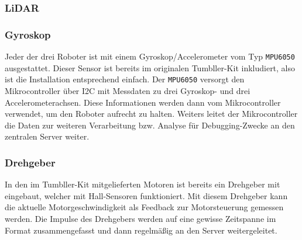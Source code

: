 \subsubsection{LiDAR}
\label{subsec:ueberblick_lidar}

\subsubsection{Gyroskop}
Jeder der drei Roboter ist mit einem Gyroskop/Accelerometer vom Typ \texttt{MPU6050} ausgestattet.
%
Dieser Sensor ist bereits im originalen Tumbller-Kit inkludiert, also ist die Installation entsprechend einfach.
%
Der \texttt{MPU6050} versorgt den Mikrocontroller über I2C mit Messdaten zu drei Gyroskop- und drei Accelerometerachsen.
%
Diese Informationen werden dann vom Mikrocontroller verwendet, um den Roboter aufrecht zu halten.
%
Weiters leitet der Mikrocontroller die Daten zur weiteren Verarbeitung bzw. Analyse für Debugging-Zwecke an den zentralen Server weiter.

\subsubsection{Drehgeber}
\label{subsec:ueberblick_rot_enc}
In den im Tumbller-Kit mitgelieferten Motoren ist bereits ein Drehgeber mit eingebaut,
welcher mit Hall-Sensoren funktioniert.
%
Mit diesem Drehgeber kann die aktuelle Motorgeschwindigkeit als Feedback zur Motorsteuerung gemessen werden.
%
Die Impulse des Drehgebers werden auf eine gewisse Zeitspanne im Format zusammengefasst und dann regelmäßig an den Server weitergeleitet.